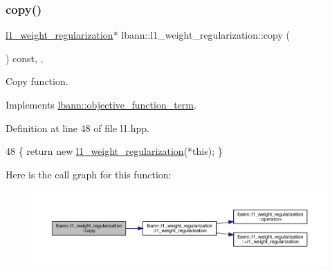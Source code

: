 \mbox{\label{classlbann_1_1l1__weight__regularization_aa5cbb7a878224e152e8e425bb99ea09a}} 
\subsubsection{\texorpdfstring{copy()}{copy()}}
{\footnotesize\ttfamily \hyperlink{classlbann_1_1l1__weight__regularization}{l1\+\_\+weight\+\_\+regularization}$\ast$ lbann\+::l1\+\_\+weight\+\_\+regularization\+::copy (\begin{DoxyParamCaption}{ }\end{DoxyParamCaption}) const\hspace{0.3cm}{\ttfamily [inline]}, {\ttfamily [override]}, {\ttfamily [virtual]}}

Copy function. 

Implements \hyperlink{classlbann_1_1objective__function__term_ae98a4ec173a602ad55d1df20dadd4cb9}{lbann\+::objective\+\_\+function\+\_\+term}.



Definition at line 48 of file l1.\+hpp.


\begin{DoxyCode}
48 \{ \textcolor{keywordflow}{return} \textcolor{keyword}{new} \hyperlink{classlbann_1_1l1__weight__regularization_a8416f2197baad2b9850163ecba72a4c4}{l1\_weight\_regularization}(*\textcolor{keyword}{this}); \}
\end{DoxyCode}
Here is the call graph for this function\+:\nopagebreak
\begin{figure}[H]
\begin{center}
\leavevmode
\includegraphics[width=350pt]{classlbann_1_1l1__weight__regularization_aa5cbb7a878224e152e8e425bb99ea09a_cgraph}
\end{center}
\end{figure}
\mbox{\label{classlbann_1_1l1__weight__regularization_a329af165a876f4c1668aee84339e9ad2}} 

